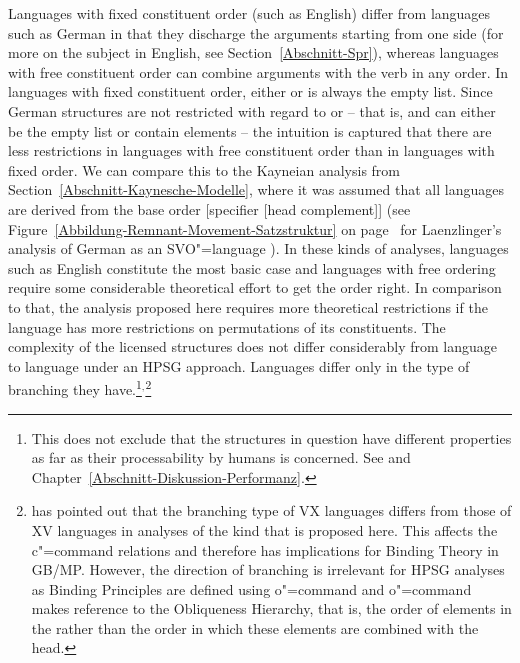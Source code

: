 Languages with fixed constituent order (such as English)
differ from languages such as German in that they discharge the arguments starting from one side (for more on the subject in
English, see Section~\ref{Abschnitt-Spr}), whereas languages with free constituent order can combine arguments with the verb
in any order. In languages with fixed constituent order, either  or  is always the empty list. Since German structures are
not restricted with regard to 
or  -- that is,  and  can either be the empty list or contain elements -- the
intuition is captured that there are less restrictions in languages with free constituent order than in languages with fixed order.
We can compare this to the Kayneian analysis from Section~\ref{Abschnitt-Kaynesche-Modelle}, where it was assumed
that all languages are derived from the base order [specifier [head complement]] (see
Figure~\ref{Abbildung-Remnant-Movement-Satzstruktur} on page~\pageref{Abbildung-Remnant-Movement-Satzstruktur} for Laenzlinger's analysis of German as an
SVO"=language \citep{Laenzlinger2004a}). In these kinds of analyses, languages such as English constitute the most basic case and languages with
free ordering require some considerable theoretical effort to get the order right. In comparison to that, the analysis proposed here
requires more theoretical restrictions if the language has more restrictions on permutations of its constituents. The complexity of
the licensed structures does not differ considerably from language to language under an HPSG approach. Languages differ only in the type
of branching they have.\footnote{%
This does not exclude that the structures in question have different properties as far as their
processability by humans is concerned. See  and
  Chapter~\ref{Abschnitt-Diskussion-Performanz}.
}$^,$\footnote{%
\citet[]{Haider97c} has pointed out that the branching type of VX languages differs from
those of XV languages in analyses of the kind that is proposed here. This affects the c"=command
relations and therefore has implications for Binding Theory in GB/MP. However, the direction of branching is irrelevant for HPSG analyses as
Binding Principles are defined using o"=command \citep[Chapter~6]{ps2} and o"=command makes reference to the Obliqueness 
Hierarchy, that is, the order of elements in the \compsl rather than the order in which these elements are combined with the head.
}

